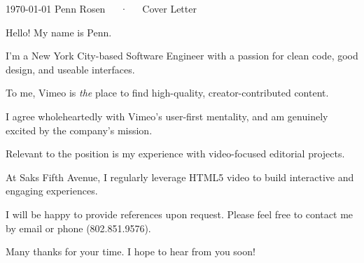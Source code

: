 \documentclass[12pt, letterpaper]{awesome-cv}
\newcommand{\companyname}{Vimeo}
\begin{document}
\makecvheader[R]

\makecvfooter
  {\today}
  {Penn Rosen~~~·~~~Cover Letter}
  {}

\makelettertitle

\begin{cvletter}

Hello! My name is Penn.

I'm a New York City-based Software Engineer with a passion for clean code, good design, and useable interfaces.


To me, \companyname{} is \textit{the} place to find high-quality, creator-contributed content. 

I agree wholeheartedly with \companyname's user-first mentality, and am genuinely excited by the company's mission. 



Relevant to the position is my experience with video-focused editorial projects. 

At Saks Fifth Avenue, I regularly leverage HTML5 video to build interactive and engaging experiences. 


I will be happy to provide references upon request. Please feel free to contact me by email or phone (802.851.9576).

Many thanks for your time. I hope to hear from you soon! 

\end{cvletter}


\makeletterclosing
\end{document}
